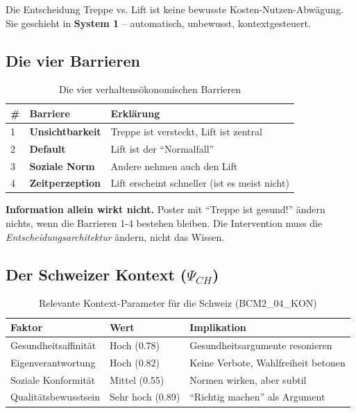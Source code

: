 \documentclass[11pt,a4paper]{article}
\begin{document}
Die Entscheidung Treppe vs. Lift ist keine bewusste Kosten-Nutzen-Abwägung. Sie geschieht in \textbf{System 1} -- automatisch, unbewusst, kontextgesteuert.

\subsection{Die vier Barrieren}

\begin{table}[h]
\centering
\begin{tabular}{llp{6cm}}
\toprule
\textbf{\#} & \textbf{Barriere} & \textbf{Erklärung} \\
\midrule
1 & \textbf{Unsichtbarkeit} & Treppe ist versteckt, Lift ist zentral \\
2 & \textbf{Default} & Lift ist der ``Normalfall'' \\
3 & \textbf{Soziale Norm} & Andere nehmen auch den Lift \\
4 & \textbf{Zeitperzeption} & Lift erscheint schneller (ist es meist nicht) \\
\bottomrule
\end{tabular}
\caption{Die vier verhaltensökonomischen Barrieren}
\end{table}

\begin{tcolorbox}[warning={Häufiger Fehler}]
\textbf{Information allein wirkt nicht.} Poster mit ``Treppe ist gesund!'' ändern nichts, wenn die Barrieren 1-4 bestehen bleiben. Die Intervention muss die \textit{Entscheidungsarchitektur} ändern, nicht das Wissen.
\end{tcolorbox}

\subsection{Der Schweizer Kontext ($\Psi_{CH}$)}

\begin{table}[h]
\centering
\begin{tabular}{lll}
\toprule
\textbf{Faktor} & \textbf{Wert} & \textbf{Implikation} \\
\midrule
Gesundheitsaffinität & Hoch (0.78) & Gesundheitsargumente resonieren \\
Eigenverantwortung & Hoch (0.82) & Keine Verbote, Wahlfreiheit betonen \\
Soziale Konformität & Mittel (0.55) & Normen wirken, aber subtil \\
Qualitätsbewusstsein & Sehr hoch (0.89) & ``Richtig machen'' als Argument \\
\bottomrule
\end{tabular}
\caption{Relevante Kontext-Parameter für die Schweiz (BCM2\_04\_KON)}
\end{table}
\end{document}
